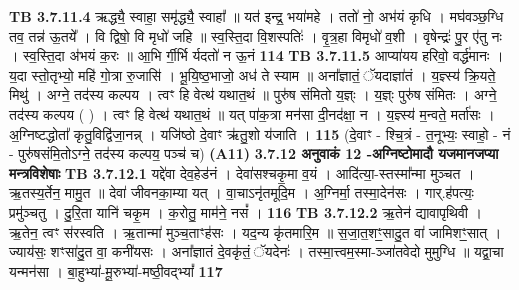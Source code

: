 \documentclass[17pt]{extarticle}
\begin{document}
{{{{{{{{{{{{{{{{{{{                  \newline
                                \textbf{ TB 3.7.11.4} \newline
                  ऋद्ध्यै॒ स्वाहा॒ समृ॑द्ध्यै॒ स्वाहा᳚ ॥ यत॑ इन्द्र॒ भया॑महे । ततो॑ नो॒ अभ॑यं कृधि । मघ॑वञ्छ॒ग्धि तव॒ तन्न॑ ऊ॒तये᳚ । वि द्विषो॒ वि मृधो॑ जहि ॥ स्व॒स्ति॒दा वि॒शस्पतिः॑ । वृ॒त्र॒हा विमृधो॑ व॒शी । वृषेन्द्रः॑ पु॒र ए॑तु नः । स्व॒स्ति॒दा अ॑भयं क॒रः ॥ आ॒भि र्गी॒र्भि र्यदतो॑ न ऊ॒नं \textbf{ 114} \newline
                  \newline
                                \textbf{ TB 3.7.11.5} \newline
                  आप्या॑यय हरिवो॒ वर्द्ध॑मानः । य॒दा स्तो॒तृभ्यो॒ महि॑ गो॒त्रा रु॒जासि॑ । भू॒यि॒ष्ठ॒भाजो॒ अध॑ ते स्याम ॥ अना᳚ज्ञातं॒ ॅयदाज्ञा॑तं । य॒ज्ञ्स्य॑ क्रि॒यते॒ मिथु॑ । अग्ने॒ तद॑स्य कल्पय । त्वꣳ हि वेत्थ॑ यथात॒थं ॥ पुरु॑ष संमितो य॒ज्ञ्ः । य॒ज्ञ्ः पुरु॑ष संमितः । अग्ने॒ तद॑स्य कल्पय ( ) । त्वꣳ हि वेत्थ॑ यथात॒थं ॥ यत् पा॑क॒त्रा मन॑सा दी॒नद॑क्षा॒ न । य॒ज्ञ्स्य॑ म॒न्वते॒ मर्ता॑सः । अ॒ग्निष्टद्धोता᳚ कृतु॒विद्वि॑जा॒नन्न् । यजि॑ष्ठो दे॒वाꣳ ऋ॑तु॒शो य॑जाति । \textbf{ 115} \newline
                  \newline
                                    (दे॒वाꣳ - श्चि॒त्रं - त॒नूभ्यः॒ स्वाहो॒ - नं - पुरु॑षसंमि॒तोऽग्ने॒ तद॑स्य कल्पय॒ पञ्च॑ च) \textbf{(A11)} \newline \newline
                \textbf{ 3.7.12    अनुवाकं   12 -अग्निष्टोमादौ यजमानजप्या मन्त्रविशेषाः} \newline
                                \textbf{ TB 3.7.12.1} \newline
                  यद्दे॑वा देव॒हेड॑नं । देवा॑सश्चकृ॒मा व॒यं । आदि॑त्या॒-स्तस्मा᳚न्मा मुञ्चत । ऋ॒तस्य॒र्तेन॒ मामु॒त ॥ देवा॑ जीवनका॒म्या यत् । वा॒चाऽनृ॑तमूदि॒म । अ॒ग्निर्मा॒ तस्मा॒देन॑सः । गार्.ह॑पत्यः॒ प्रमु॑ञ्चतु । दु॒रि॒ता यानि॑ चकृ॒म । क॒रोतु॒ माम॑ने॒ नसं᳚ । \textbf{ 116} \newline
                  \newline
                                \textbf{ TB 3.7.12.2} \newline
                  ऋ॒तेन॑ द्यावापृथिवी । ऋ॒तेन॒ त्वꣳ स॑रस्वति । ऋ॒तान्मा॑ मुञ्च॒ताꣳह॑सः । यद॒न्य कृ॑तमारि॒म ॥ स॒जा॒त॒शꣳ॒॒सादु॒त वा॑ जामिशꣳ॒॒सात् । ज्याय॑सः॒ शꣳसा॑दु॒त वा॒ कनी॑यसः । अना᳚ज्ञातं दे॒वकृ॑तं॒ ॅयदेनः॑ । तस्मा॒त्त्वम॒स्मा-ञ्जा॑तवेदो मुमुग्धि ॥ यद्वा॒चा यन्मन॑सा । बा॒हुभ्या॑-मू॒रुभ्या॑-मष्ठी॒वद्भ्यां᳚ \textbf{ 117} \newline
}}}}}}}}}}}}}}}}}}}
\end{document}
